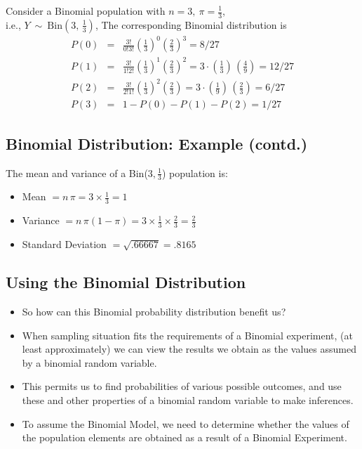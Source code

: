 \documentclass[
  letterpaper,
  DIV=11,
  numbers=noendperiod]{scrartcl}
\begin{document}
Consider a Binomial population with \(n=3,\ \pi = \frac13\),\\
i.e., \(Y\ \sim\ \mbox{Bin}(3,\,\frac13)\), The corresponding Binomial
distribution is\\
\[\begin{eqnarray*}
  P(0) &=& \frac{3!}{0!3!} \left(\frac13 \right)^0 \left( \frac23
           \right)^3 = 8/27\\[.1in]
  P(1) &=&  \frac{3!}{1!2!} \left(\frac13 \right)^1 \left( \frac23
           \right)^2 = 3 \cdot \left( \frac13
           \right)\, \left(\frac49 \right) = 12/27 \\[.1in]    
  P(2) &=&  \frac{3!}{2!1!} \left(\frac13 \right)^2 \left( \frac23
           \right) = 3 \cdot \left( \frac19
           \right)\, \left(\frac23 \right) = 6/27 \\[.2in]
  P(3) &=& 1 - P(0) - P(1) - P(2) = 1/27
\end{eqnarray*}\]

\subsection{Binomial Distribution: Example
(contd.)}\label{binomial-distribution-example-contd.}

The mean and variance of a Bin(\(3,\frac{1}{3}\)) population is:

\begin{itemize}
\item
  Mean \(= n \, \pi =  3 \times\frac{1}{3} = 1\)
\item
  Variance
  \(=  n\,\pi(1 - \pi) =  3 \times\frac{1}{3}\times\frac{2}{3} =
  \frac{2}{3}\)
\item
  Standard Deviation \(= \sqrt{.66667} = .8165\)
\end{itemize}

\subsection{Using the Binomial
Distribution}\label{using-the-binomial-distribution}

\begin{itemize}
\item
  So how can this Binomial probability distribution benefit us?
\item
  When sampling situation fits the requirements of a Binomial
  experiment, (at least approximately) we can view the results we obtain
  as the values assumed by a binomial random variable.
\item
  This permits us to find probabilities of various possible outcomes,
  and use these and other properties of a binomial random variable to
  make inferences.
\item
  To assume the {Binomial Model}, we need to determine whether the
  values of the population elements are obtained as a result of a
  {Binomial Experiment}.
\end{itemize}
\end{document}
